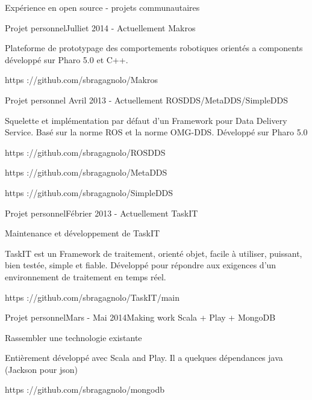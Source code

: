 \documentclass{resume} %
\begin{document}
\begin{rSection}{Exp\'{e}rience en open source - projets communautaires}

	\begin{rSubsection}{Projet personnel}{Julliet 2014 - Actuellement }{Makros}
		\item 
		\item Plateforme de prototypage des comportements robotiques orient\'{e}s a components d\'{e}velopp\'{e} sur Pharo 5.0 et C++.
		\item https ://github.com/sbragagnolo/Makros		
	\end{rSubsection}
	\begin{rSubsection}{Projet personnel}{  Avril 2013 - Actuellement }{ROSDDS/MetaDDS/SimpleDDS}
		\item 
		\item Squelette et impl\'{e}mentation par d\'{e}faut d'un Framework pour Data Delivery Service.  Bas\'{e} sur la norme ROS et la norme OMG-DDS. D\'{e}velopp\'{e} sur Pharo 5.0 
		\item https ://github.com/sbragagnolo/ROSDDS		
		\item https ://github.com/sbragagnolo/MetaDDS
		\item https ://github.com/sbragagnolo/SimpleDDS
	\end{rSubsection}
	\begin{rSubsection}{Projet personnel}{F\'{e}brier 2013 - Actuellement }{TaskIT}
		\item 
		\item Maintenance et d\'{e}veloppement de TaskIT
		\item TaskIT est un Framework de traitement, orient\'{e} objet, facile \`{a} utiliser, puissant, bien test\'{e}e, simple et fiable. D\'{e}velopp\'{e} pour r\'{e}pondre aux exigences d'un environnement de traitement en temps r\'{e}el.
		\item  https ://github.com/sbragagnolo/TaskIT/main
	\end{rSubsection}

\begin{rSubsection}{Projet personnel}{Mars - Mai 2014}{Making work Scala + Play + MongoDB}
	\item 
	\item Rassembler une technologie existante
	\item Enti\`{e}rement d\'{e}velopp\'{e} avec Scala and Play. Il a quelques d\'{e}pendances java (Jackson pour json)
	\item https ://github.com/sbragagnolo/mongodb
\end{rSubsection}


\end{rSection}
\end{document}
